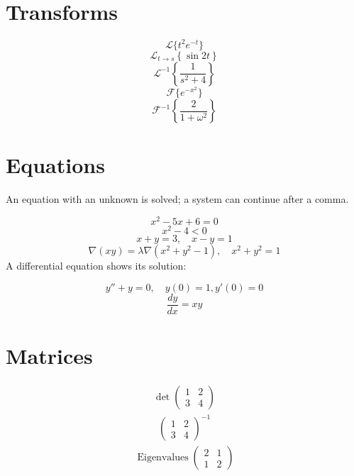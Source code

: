 \documentclass[11pt,a4paper]{article}
\theoremstyle{plain}
\theoremstyle{definition}
\theoremstyle{remark}
\begin{document}
\section*{Transforms}

\begin{equation*}
  \mathcal{L}\{t^2 e^{-t}\}
\end{equation*}
\begin{equation*}
  \mathcal{L}_{t \to s}\left\{ \sin 2t \right\}
\end{equation*}
\begin{equation*}
  \mathcal{L}^{-1}\left\{ \frac{1}{s^2 + 4} \right\}
\end{equation*}
\begin{equation*}
  \mathcal{F}\{e^{-x^2}\}
\end{equation*}
\begin{equation*}
  \mathcal{F}^{-1}\left\{ \frac{2}{1 + \omega^2} \right\}
\end{equation*}
\section*{Equations}

An equation with an unknown is solved; a system can continue after a comma.

\begin{equation*}
  x^2 - 5x + 6 = 0
\end{equation*}
\begin{equation*}
  x^2 - 4 < 0
\end{equation*}
\begin{equation*}
  x + y = 3, \quad x - y = 1
\end{equation*}
\begin{equation*}
  \nabla (x y) = \lambda \nabla (x^2 + y^2 - 1), \quad x^2 + y^2 = 1
\end{equation*}
A differential equation shows its solution:

\begin{equation*}
  y'' + y = 0, \quad y(0) = 1, y'(0) = 0
\end{equation*}
\begin{equation*}
  \frac{dy}{dx} = x y
\end{equation*}
\section*{Matrices}

\begin{align*}
  \det \begin{pmatrix} 1 & 2 \\ 3 & 4 \end{pmatrix}
\end{align*}
\begin{align*}
  \begin{pmatrix} 1 & 2 \\ 3 & 4 \end{pmatrix}^{-1}
\end{align*}
\begin{align*}
  \operatorname{Eigenvalues} \begin{pmatrix} 2 & 1 \\ 1 & 2 \end{pmatrix}
\end{align*}
\end{document}
